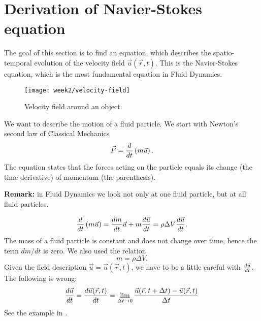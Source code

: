 \section{Derivation of Navier-Stokes equation}
The goal of this section is to find an equation, which describes the spatio-temporal evolution of the velocity field $\vec{u}(\vec{r},t)$. This is the Navier-Stokes equation, which is the most fundamental equation in Fluid Dynamics.
\begin{figure}[!h]
    \centering
    \texttt{[image: week2/velocity-field]}
    \caption{Velocity field around an object.}
    \label{fig:velocity-field}
\end{figure}

We want to describe the motion of a fluid particle. We start with Newton's second law of Classical Mechanics
\begin{equation}
\vec{F} = \frac{d }{d t}\left(m\vec{u}\right).
\end{equation}
The equation states that the forces acting on the particle equals its change (the time derivative) of momentum (the parenthesis).
\begin{framed}
\textbf{Remark:} in Fluid Dynamics we look not only at one fluid particle, but at all fluid particles.
\end{framed}
\begin{equation}
\frac{d }{d t}\left(m\vec{u}\right) = \frac{d m}{d t}\vec{u}+m\frac{d \vec{u}}{d t}=\rho\Delta V\frac{d \vec{u}}{d t}.
\end{equation}
The mass of a fluid particle is constant and does not change over time, hence the term $dm/dt$ is zero. We also used the relation
\begin{equation}
m=\rho\Delta V.
\end{equation}
Given the field description $\vec{u}=\vec{u}(\vec{r},t)$, we have to be a little careful with $\frac{d \vec{u}}{d t}$. The following is wrong:
\begin{equation}
\frac{d \vec{u}}{d t} = \frac{d \vec{u}(\vec{r},t)}{d t} = \lim_{\Delta t \rightarrow 0} \frac{\vec{u}(\vec{r},t+\Delta t) - \vec{u}(\vec{r},t)}{\Delta t}
\end{equation}
See the example in .


